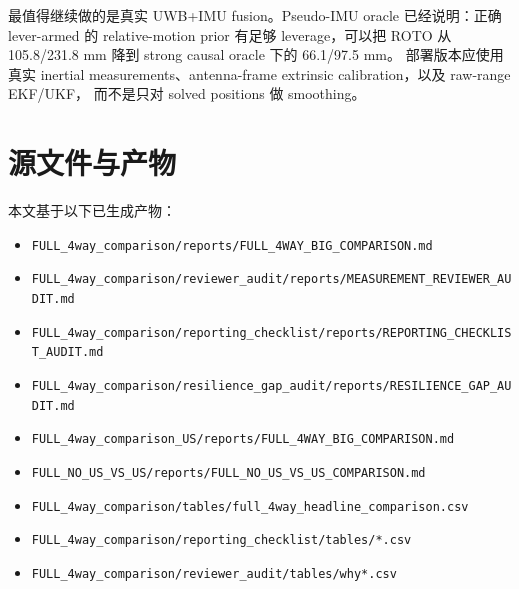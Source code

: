 \documentclass[UTF8,11pt,a4paper]{ctexart}
\newcommand{\case}[1]{\texttt{#1}}
\begin{document}
最值得继续做的是真实 UWB+IMU fusion。Pseudo-IMU oracle 已经说明：正确 lever-armed 的 relative-motion prior
有足够 leverage，可以把 ROTO 从 105.8/231.8 mm 降到 strong causal oracle 下的 66.1/97.5 mm。
部署版本应使用真实 inertial measurements、antenna-frame extrinsic calibration，以及 raw-range EKF/UKF，
而不是只对 solved positions 做 smoothing。

\section{源文件与产物}

本文基于以下已生成产物：
\begin{itemize}
    \item \case{FULL\_4way\_comparison/reports/FULL\_4WAY\_BIG\_COMPARISON.md}
    \item \case{FULL\_4way\_comparison/reviewer\_audit/reports/MEASUREMENT\_REVIEWER\_AUDIT.md}
    \item \case{FULL\_4way\_comparison/reporting\_checklist/reports/REPORTING\_CHECKLIST\_AUDIT.md}
    \item \case{FULL\_4way\_comparison/resilience\_gap\_audit/reports/RESILIENCE\_GAP\_AUDIT.md}
    \item \case{FULL\_4way\_comparison\_US/reports/FULL\_4WAY\_BIG\_COMPARISON.md}
    \item \case{FULL\_NO\_US\_VS\_US/reports/FULL\_NO\_US\_VS\_US\_COMPARISON.md}
    \item \case{FULL\_4way\_comparison/tables/full\_4way\_headline\_comparison.csv}
    \item \case{FULL\_4way\_comparison/reporting\_checklist/tables/*.csv}
    \item \case{FULL\_4way\_comparison/reviewer\_audit/tables/why*.csv}
\end{itemize}
\end{document}
